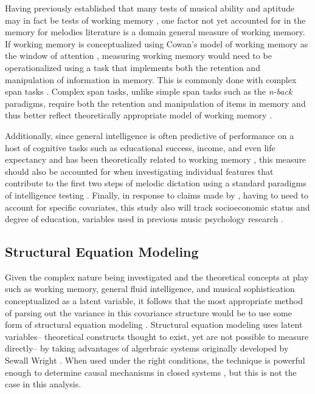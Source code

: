 \documentclass[12pt,]{book}
\begin{document}
Having previously established that many tests of musical ability and aptitude may in fact be tests of working memory \citep{berzWorkingMemoryMusic1995}, one factor not yet accounted for in the memory for melodies literature is a domain general measure of working memory.
If working memory is conceptualized using Cowan's model of working memory as the window of attention \citep{cowanMagicalMysteryFour2010}, measuring working memory would need to be operationalized using a task that implements both the retention and manipulation of information in memory.
This is commonly done with complex span tasks \citep{unsworthAutomatedVersionOperation2005}.
Complex span tasks, unlike simple span tasks such as the \emph{n-back} paradigms, require both the retention and manipulation of items in memory and thus better reflect theoretically appropriate model of working memory \citep{cowanWorkingMemoryCapacity2005}.

Additionally, since general intelligence is often predictive of performance on a host of cognitive tasks such as educational success, income, and even life expectancy \citep{ritchieIntelligenceAllThat2015} and has been theoretically related to working memory \citep{kovacsProcessOverlapTheory2016}, this measure should also be accounted for when investigating individual features that contribute to the first two steps of melodic dictation using a standard paradigms of intelligence testing \citep{ravenManualRavenProgressive1994, thurstonePrimaryMentalAbilities1938}.
Finally, in response to claims made by \citet{okadaIndividualDifferencesMusical2018}, having to need to account for specific covariates, this study also will track socioeconomic status and degree of education, variables used in previous music psychology research \citep{corrigallMusicTrainingCognition2013, swaminathanRevisitingAssociationMusic2017}.

\hypertarget{structural-equation-modeling}{%
\subsection{Structural Equation Modeling}\label{structural-equation-modeling}}

Given the complex nature being investigated and the theoretical concepts at play such as working memory, general fluid intelligence, and musical sophistication conceptualized as a latent variable, it follows that the most appropriate method of parsing out the variance in this covariance structure would be to use some form of structural equation modeling \citep{beaujeanLatentVariableModeling2014}.
Structural equation modeling uses latent variables-- theoretical constructs thought to exist, yet are not possible to measure directly-- by taking advantages of algerbraic systems originally developed by Sewall Wright \citep{wrightMethodPathCoefficents1934}.
When used under the right conditions, the technique is powerful enough to determine causal mechanisms in closed systems \citep{pearlBookWhyNew2018}, but this is not the case in this analysis.
\end{document}
